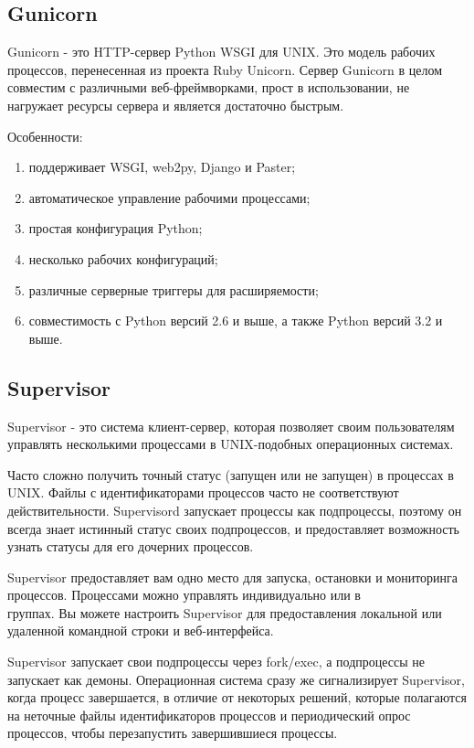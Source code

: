 \subsection{Gunicorn}
\label{sec:development:gunicorn}

Gunicorn - это HTTP-сервер Python WSGI для UNIX. Это модель рабочих процессов, перенесенная из проекта Ruby Unicorn. Сервер Gunicorn в целом совместим с различными веб-фреймворками, прост в использовании, не нагружает ресурсы сервера и является достаточно быстрым.

Особенности:
\begin{enumerate}
  \item поддерживает WSGI, web2py, Django и Paster;
  \item автоматическое управление рабочими процессами;
  \item простая конфигурация Python;
  \item несколько рабочих конфигураций;
  \item различные серверные триггеры для расширяемости;
  \item совместимость с Python версий 2.6 и выше, а также Python версий 3.2 и выше.
\end{enumerate}

\subsection{Supervisor}
\label{sec:development:supervisor}

Supervisor - это система клиент-сервер, которая позволяет своим пользователям управлять несколькими процессами в UNIX-подобных операционных системах.

Часто сложно получить точный статус (запущен или не запущен) в процессах в UNIX. Файлы с идентификаторами процессов часто не соответствуют действительности. Supervisord запускает процессы как подпроцессы, поэтому он всегда знает истинный статус своих подпроцессов, и предоставляет возможность узнать статусы для его дочерних процессов.

Supervisor предоставляет вам одно место для запуска, остановки и мониторинга процессов. Процессами можно управлять индивидуально или в \\группах. Вы можете настроить Supervisor для предоставления локальной или удаленной командной строки и веб-интерфейса.

Supervisor запускает свои подпроцессы через fork/exec, а подпроцессы не запускает как демоны. Операционная система сразу же сигнализирует Supervisor, когда процесс завершается, в отличие от некоторых решений, которые полагаются на неточные файлы идентификаторов процессов и периодический опрос процессов, чтобы перезапустить завершившиеся процессы.

